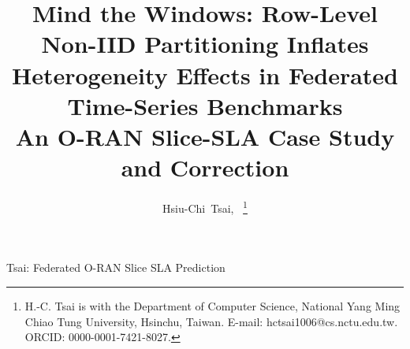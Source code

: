 \documentclass[journal]{IEEEtran}
\begin{document}
\title{Mind the Windows: Row-Level Non-IID Partitioning Inflates Heterogeneity Effects in Federated Time-Series Benchmarks\\
An O-RAN Slice-SLA Case Study and Correction}

\author{%
    Hsiu-Chi~Tsai,~%
    \thanks{H.-C. Tsai is with the Department of Computer Science,
    National Yang Ming Chiao Tung University, Hsinchu, Taiwan.
    E-mail: \mbox{hctsai1006@cs.nctu.edu.tw}.
    ORCID: 0000-0001-7421-8027.}%
}

%
{Tsai: Federated O-RAN Slice SLA Prediction}

\maketitle
\end{document}
